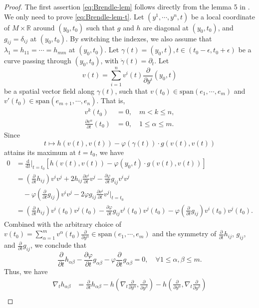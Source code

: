 \documentclass[reqno]{amsart}
\theoremstyle{remark}
\newcommand{\dd}{\ensuremath{\text{d}}}
\newcommand{\R}{\ensuremath{\mathbb{R}}}
\newcommand{\pd}[2]{\frac{\partial {#1}}{\partial {#2}}}
\theoremstyle{definition}
\numberwithin{equation}{section}
\begin{document}
\begin{proof}
    The first assertion \eqref{eq:Brendle-lem} follows directly from the lemma 5 in \cite{Brendle2017}. We only need to prove \eqref{eq:Brendle-lem-t}. Let \((y^1,\cdots,y^n,t)\) be a local coordinate of \(M\times \R\) around \((y_0,t_0)\) such that \(g\) and \(h\) are diagonal at \((y_0,t_0)\), and \(g_{ij}=\delta_{ij}\) at \((y_0,t_0)\). By switching the indexes, we also assume that \(\lambda_1 = h_{11} = \cdots = h_{mm}\) at $(y_0,t_0)$. Let \(\gamma(t) = (y_0,t), t\in (t_0-\epsilon,t_0 + \epsilon)\) be a curve passing through \((y_0,t_0)\), with \(\dot{\gamma}(t) = \partial_t\). Let \[ v(t) = \sum_{i=1}^{n}v^i(t)\pd{}{y^i}(y_0,t)\] be a spatial vector field along \(\gamma(t)\), such that \(v(t_0) \in \text{span}(e_1,\cdots,e_m)\) and \(v'(t_0) \in \text{span}(e_{m+1},\cdots,e_n)\). That is, 
    \[ \begin{aligned}
        v^k(t_0) &= 0, \quad m < k \leq n, \\
        \pd{v^\alpha}{t}(t_0) &= 0, \quad 1\leq \alpha \leq m.
    \end{aligned} \]
    Since 
    \[ t\mapsto h(v(t),v(t)) - \varphi(\gamma(t))\cdot g(v(t),v(t)) \]
    attains its maximum at \(t = t_0\), we have 
    \[ \begin{aligned}
    0 &= \frac{\dd}{\dd t}\bigg|_{t=t_0}\left[h(v(t),v(t)) - \varphi(y_0,t)\cdot g(v(t),v(t))\right] \\
    &= \left(\pd{}{t}h_{ij}\right)v^i v^j + 2h_{ij}\pd{v^i}{t}v^j - \pd{\varphi}{t}g_{ij}v^i v^j \\
    &\quad -\varphi\left(\pd{}{t}g_{ij}\right)v^i v^j - 2\varphi g_{ij}\pd{v^i}{t} v^j \bigg|_{t=t_0}\\
    &= \left(\pd{}{t}h_{ij}\right)v^i(t_0) v^j(t_0) - \pd{\varphi}{t}g_{ij}v^i(t_0) v^j(t_0) -\varphi\left(\pd{}{t}g_{ij}\right)v^i(t_0) v^j(t_0).
    \end{aligned}
    \]
    Combined with the arbitrary choice of \(v(t_0) = \sum_{\alpha=1}^{m}v^\alpha(t_0) \pd{}{y^\alpha} \in \text{span}(e_1,\cdots,e_m)\) and the symmetry of \(\pd{}{t}h_{ij}\), \(g_{ij}\), and \(\pd{}{t}g_{ij}\), we conclude that 
    \[  \pd{}{t}h_{\alpha\beta} - \pd{\varphi}{t}g_{\alpha\beta} - \varphi \pd{}{t}g_{\alpha\beta} = 0,\quad \forall 1\leq \alpha,\beta \leq m.  \] 
  Thus, we have 
    \[ \begin{aligned}
        \nabla_t h_{\alpha\beta} &= \pd{}{t} h_{\alpha\beta} - h\left(\nabla_t \pd{}{y^\alpha}, \pd{}{y^\beta}\right) - h\left(\pd{}{y^\alpha}, \nabla_t\pd{}{y^\beta}\right)\\

\end{aligned}\]
\end{proof}
\end{document}
